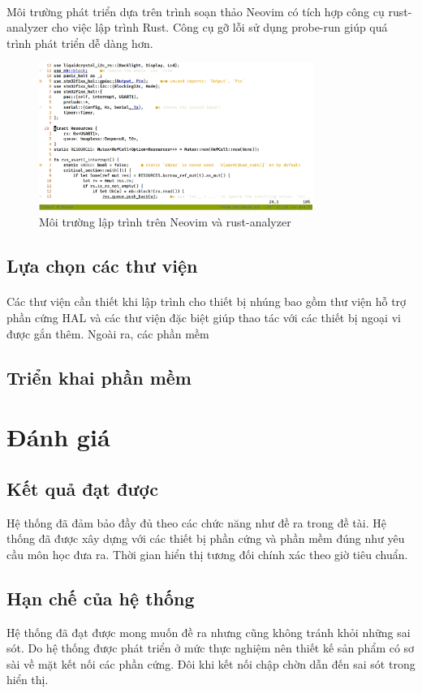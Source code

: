 \paragraph{}
Môi trường phát triển dựa trên trình soạn thảo Neovim có tích hợp công cụ rust-analyzer cho việc lập trình Rust. Công cụ gỡ lỗi sử dụng probe-run giúp quá trình phát triển dễ dàng hơn.
\begin{figure}[H]
    \centering
    \includegraphics[width=0.8\textwidth]{images/Screenshot from 2023-06-14 21-28-38.png}
    \caption{Môi trường lập trình trên Neovim và rust-analyzer}
    \label{fig:enter-label}
\end{figure}


\subsection{Lựa chọn các thư viện}
\paragraph{}
Các thư viện cần thiết khi lập trình cho thiết bị nhúng bao gồm thư viện hỗ trợ phần cứng HAL và các thư viện đặc biệt giúp thao tác với các thiết bị ngoại vi được gắn thêm. Ngoài ra, các phần mềm 
\subsection{Triển khai phần mềm}

\section{Đánh giá}

\subsection{Kết quả đạt được}
Hệ thống đã đảm bảo đầy đủ theo các chức năng như đề ra trong đề tài. Hệ thống đã được xây dựng với các thiết bị phần cứng và phần mềm đúng như yêu cầu môn học đưa ra.
Thời gian hiển thị tương đối chính xác theo giờ tiêu chuẩn.

\subsection{Hạn chế của hệ thống}
Hệ thống đã đạt được mong muốn đề ra nhưng cũng không tránh khỏi những sai sót. Do hệ thống được phát triển ở mức thực nghiệm nên thiết kế sản phẩm có sơ sài về mặt kết nối các phần cứng. Đôi khi kết nối chập chờn dẫn đến sai sót trong hiển thị.
